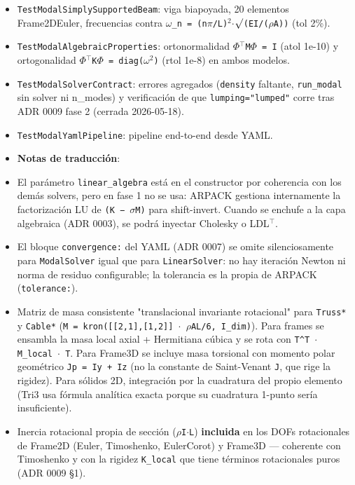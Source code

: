 \documentclass[11pt,letterpaper,oneside]{report}
\begin{document}
\begin{itemize}
  \item \texttt{TestModalSimplySupportedBeam}: viga biapoyada, 20 elementos Frame2DEuler, frecuencias contra \texttt{\ensuremath{\omega}\_n = (n\ensuremath{\pi}/L)\ensuremath{^{2}}\ensuremath{\cdot}\ensuremath{\surd}(EI/(\ensuremath{\rho}A))} (tol 2\%).
  \item \texttt{TestModalAlgebraicProperties}: ortonormalidad \texttt{\ensuremath{\Phi}\ensuremath{^{\top}}M\ensuremath{\Phi} = I} (atol 1e-10) y ortogonalidad \texttt{\ensuremath{\Phi}\ensuremath{^{\top}}K\ensuremath{\Phi} = diag(\ensuremath{\omega}\ensuremath{^{2}})} (rtol 1e-8) en ambos modelos.
  \item \texttt{TestModalSolverContract}: errores agregados (\texttt{density} faltante, \texttt{run\_modal} sin solver ni n\_modes) y verificación de que \texttt{lumping="lumped"} corre tras ADR 0009 fase 2 (cerrada 2026-05-18).
  \item \texttt{TestModalYamlPipeline}: pipeline end-to-end desde YAML.
  \item \textbf{Notas de traducción}:
  \item El parámetro \texttt{linear\_algebra} está en el constructor por coherencia con los demás solvers, pero en fase 1 no se usa: ARPACK gestiona internamente la factorización LU de \texttt{(K − \ensuremath{\sigma}M)} para shift-invert. Cuando se enchufe a la capa algebraica (ADR 0003), se podrá inyectar Cholesky o LDL\ensuremath{^{\top}}.
  \item El bloque \texttt{convergence:} del YAML (ADR 0007) se omite silenciosamente para \texttt{ModalSolver} igual que para \texttt{LinearSolver}: no hay iteración Newton ni norma de residuo configurable; la tolerancia es la propia de ARPACK (\texttt{tolerance:}).
  \item Matriz de masa consistente "translacional invariante rotacional" para \texttt{Truss*} y \texttt{Cable*} (\texttt{M = kron([[2,1],[1,2]] \ensuremath{\cdot} \ensuremath{\rho}AL/6, I\_dim)}). Para frames se ensambla la masa local axial + Hermitiana cúbica y se rota con \texttt{T\textasciicircum{}T \ensuremath{\cdot} M\_local \ensuremath{\cdot} T}. Para Frame3D se incluye masa torsional con momento polar geométrico \texttt{Jp = Iy + Iz} (no la constante de Saint-Venant \texttt{J}, que rige la rigidez). Para sólidos 2D, integración por la cuadratura del propio elemento (Tri3 usa fórmula analítica exacta porque su cuadratura 1-punto sería insuficiente).
  \item Inercia rotacional propia de sección (\texttt{\ensuremath{\rho}I\ensuremath{\cdot}L}) \textbf{incluida} en los DOFs rotacionales de Frame2D (Euler, Timoshenko, EulerCorot) y Frame3D --- coherente con Timoshenko y con la rigidez \texttt{K\_local} que tiene términos rotacionales puros (ADR 0009 §1).
\end{itemize}
\end{document}
